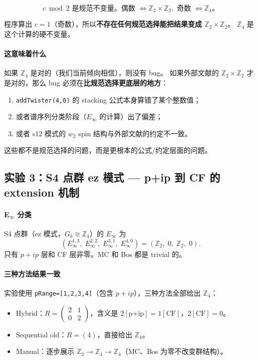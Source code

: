 \documentclass[a4paper,fontset=ubuntu,12pt]{ctexart}
\begin{document}
\begin{equation}
\boxed{c \bmod 2 \text{ 是规范不变量。偶数 }\Leftrightarrow\mathbb{Z}_2\times\mathbb{Z}_2,
\text{ 奇数 }\Leftrightarrow\mathbb{Z}_4\text{。}}
\label{eq:c-parity-invariant}
\end{equation}

程序算出 $c=1$（奇数），所以\textbf{不存在任何规范选择能把结果变成 $\mathbb{Z}_2\times\mathbb{Z}_2$}。
$\mathbb{Z}_4$ 是这个计算的硬不变量。

\paragraph{这意味着什么}

如果 $\mathbb{Z}_4$ 是对的（我们当前倾向相信），则没有 bug。
如果外部文献的 $\mathbb{Z}_2\times\mathbb{Z}_2$ 才是对的，那么 bug 必须在\textbf{比规范选择更底层的地方}：
\begin{enumerate}
\item \texttt{addTwister(4,0)} 的 stacking 公式本身算错了某个整数值；
\item 或者谱序列分类阶段（$E_\infty$ 的计算）出了偏差；
\item 或者 s12 模式的 $w_2$ spin 结构与外部文献的约定不一致。
\end{enumerate}
这些都不是规范选择的问题，而是更根本的公式/约定层面的问题。

\subsection{实验 3：S4 点群 ez 模式 --- p+ip 到 CF 的 extension 机制}
\label{sec:exp3-s4ez}

\paragraph{E$_\infty$ 分类}
S4 点群（ez 模式，$G_b \cong \mathbb{Z}_4$）的 $E_\infty$ 为
\begin{equation}
(E_\infty^{1,3},\; E_\infty^{2,2},\; E_\infty^{3,1},\; E_\infty^{4,0})
= (\mathbb{Z}_2,\; 0,\; \mathbb{Z}_2,\; 0).
\end{equation}
只有 $p{+}ip$ 层和 CF 层非零。MC 和 Bos 都是 trivial 的。

\paragraph{三种方法结果一致}
实验使用 \texttt{pRange=[1,2,3,4]}（包含 $p{+}ip$），三种方法全部给出 $\mathbb{Z}_4$：
\begin{itemize}
\item Hybrid：$R = \begin{pmatrix} 2 & 1 \\ 0 & 2 \end{pmatrix}$，含义是 $2[\text{p+ip}] = 1[\text{CF}]$，$2[\text{CF}] = 0$。
\item Sequential old：$R = (4)$，直接给出 $\mathbb{Z}_4$。
\item Manual：逐步展示 $\mathbb{Z}_2 \to \mathbb{Z}_4 \to \mathbb{Z}_4$（MC、Bos 为零不改变群结构）。
\end{itemize}
\end{document}
